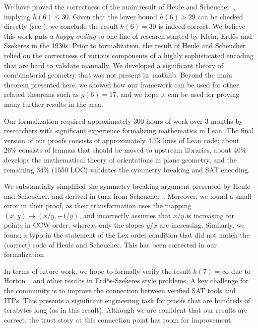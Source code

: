 We have proved the correctness of the main result of Heule and Scheucher~\cite{emptyHexagonNumber},
implying $h(6) \leq 30$.
Given that the lower bound $h(6) > 29$ can be checked directly (see \cite{emptyHexagonNumber}),
we conclude the result $h(6) = 30$ is indeed correct.
We believe this work puts a \emph{happy ending} to
one line of research started by Klein, Erd\H{o}s and Szekeres in the 1930s.
Prior to formalization, the result of Heule and Scheucher
relied on the correctness of various components of a highly sophisticated encoding
that are hard to validate manually.
We developed a significant theory of combinatorial geometry
that was not present in~\textsf{mathlib}.
Beyond the main theorem presented here,
we showed how our framework can be used for other related theorems
such as $g(6) = 17$,
and we hope it can be used for proving many further results in the area.

Our formalization required approximately 300 hours of work over 3 months
by researchers with significant experience formalizing mathematics in Lean.
The final version of our proofs consists of approximately 4.7k lines of Lean code;
about $26\%$ consists of lemmas that should be moved to upstream libraries,
about $40\%$ develops the mathematical theory of orientations in plane geometry,
and the remaining $34\%$ (1550 LOC) validates the symmetry breaking and SAT encoding.

We substantially simplified the symmetry-breaking argument presented by Heule and Scheucher,
and derived in turn from Scheucher~\cite{scheucherTwoDisjoint5holes2020}.
Moreover, we found a small error in their proof,
as their transformation uses the mapping $(x, y) \mapsto (x/y, -1/y)$,
and incorrectly assumes that $x/y$ is increasing for points in CCW-order,
whereas only the slopes $y/x$ are increasing.
Similarly, we found a typo in the statement of the \textsf{Lex order} condition
that did not match the (correct) code of Heule and Scheucher.
This has been corrected in our formalization.

In terms of future work,
we hope to formally verify the result $h(7) = \infty$ due to Horton~\cite{hortonSetsNoEmpty1983},
and other results in Erd\H{o}s-Szekeres style problems.
A key challenge for the community
is to improve the connection between verified SAT tools and ITPs.
This presents a significant engineering task
for proofs that are hundreds of terabytes long (as in this result).
Although we are confident that our results are correct,
the trust story at this connection point has room for improvement.
